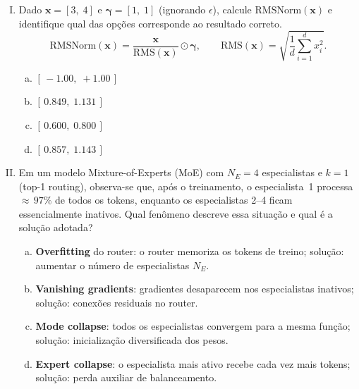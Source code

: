 \documentclass{dlproblemset}
\begin{document}
\begin{enumerate}[I)]
\item Dado $\mathbf{x} = [3,\; 4]$ e $\boldsymbol{\gamma} = [1,\; 1]$
      (ignorando $\epsilon$), calcule $\mathrm{RMSNorm}(\mathbf{x})$
      e identifique qual das opções corresponde ao resultado correto.
      \[
        \mathrm{RMSNorm}(\mathbf{x}) = \frac{\mathbf{x}}{\mathrm{RMS}(\mathbf{x})} \odot \boldsymbol{\gamma},
        \qquad
        \mathrm{RMS}(\mathbf{x}) = \sqrt{\frac{1}{d}\sum_{i=1}^d x_i^2}.
      \]

\begin{enumerate}[a)]
    \item $[\,-1.00,\;+1.00\,]$
    \item $[\,0.849,\;1.131\,]$
    \item $[\,0.600,\;0.800\,]$
    \item $[\,0.857,\;1.143\,]$
\end{enumerate}

\item Em um modelo Mixture-of-Experts (MoE) com $N_E = 4$ especialistas
      e $k = 1$ (top-1 routing), observa-se que, após o treinamento,
      o especialista~1 processa ${\approx}\,97\%$ de todos os tokens,
      enquanto os especialistas 2--4 ficam essencialmente inativos.
      Qual fenômeno descreve essa situação e qual é a solução adotada?

\begin{enumerate}[a)]
    \item \textbf{Overfitting} do router: o router memoriza os tokens de treino;
          solução: aumentar o número de especialistas $N_E$.
    \item \textbf{Vanishing gradients}: gradientes desaparecem nos especialistas
          inativos; solução: conexões residuais no router.
    \item \textbf{Mode collapse}: todos os especialistas convergem para a mesma
          função; solução: inicialização diversificada dos pesos.
    \item \textbf{Expert collapse}: o especialista mais ativo recebe cada vez mais
          tokens; solução: perda auxiliar de balanceamento.
\end{enumerate}


\end{enumerate}
\end{document}

